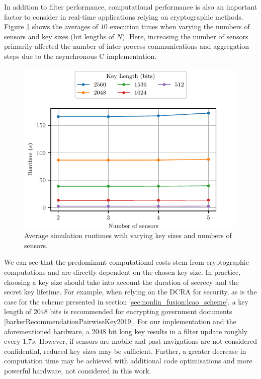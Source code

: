 In addition to filter performance, computational performance is also an important factor to consider in real-time applications relying on cryptographic methods. Figure \ref{fig:nonlin_fusion:simulation_timing} shows the averages of $10$ execution times when varying the numbers of sensors and key sizes (bit lengths of $N$). Here, increasing the number of sensors primarily affected the number of inter-process communications and aggregation steps due to the asynchronous C implementation.
\begin{figure}[htbp]
    \centering
    \includegraphics{figures/nonlin_fusion_simulation_timing.pdf}
    \caption{Average simulation runtimes with varying key sizes and numbers of sensors.}
    \label{fig:nonlin_fusion:simulation_timing}
\end{figure}
We can see that the predominant computational costs stem from cryptographic computations and are directly dependent on the chosen key size. In practice, choosing a key size should take into account the duration of secrecy and the secret key lifetime. For example, when relying on the DCRA for security, as is the case for the scheme presented in section \ref{sec:nonlin_fusion:lcao_scheme}, a key length of $2048$ bits is recommended for encrypting government documents [barkerRecommendationPairwiseKey2019]. For our implementation and the aforementioned hardware, a $2048$ bit long key results in a filter update roughly every $1.7s$. However, if sensors are mobile and past navigations are not considered confidential, reduced key sizes may be sufficient. Further, a greater decrease in computation time may be achieved with additional code optimisations and more powerful hardware, not considered in this work.


